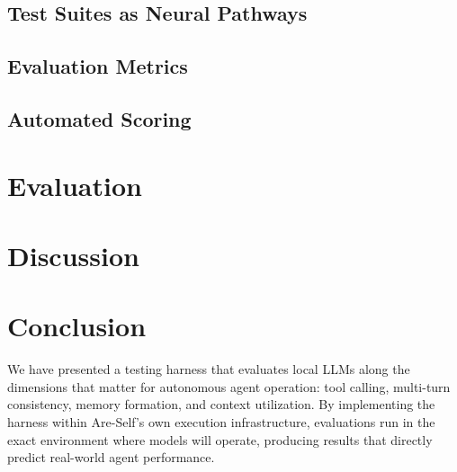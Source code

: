 \documentclass[man,12pt,floatsintext]{apa7}
\begin{document}
\subsection{Test Suites as Neural Pathways}


\subsection{Evaluation Metrics}


\subsection{Automated Scoring}


\section{Evaluation}


\section{Discussion}


\section{Conclusion}

We have presented a testing harness that evaluates local LLMs along the dimensions that
matter for autonomous agent operation: tool calling, multi-turn consistency, memory
formation, and context utilization. By implementing the harness within Are-Self's own
execution infrastructure, evaluations run in the exact environment where models will
operate, producing results that directly predict real-world agent performance.

\printbibliography
\end{document}
